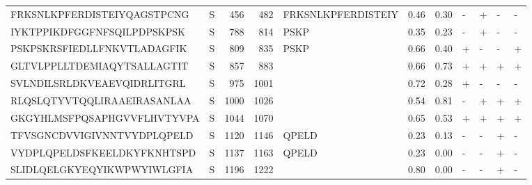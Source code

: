 \begin{tabular}{llrrlrrllll}
FRKSNLKPFERDISTEIYQAGSTPCNG &       S &    456 &   482 &  FRKSNLKPFERDISTEIY &            0.46 &             0.30 &      - &       + &      - &       - \\
IYKTPPIKDFGGFNFSQILPDPSKPSK &       S &    788 &   814 &                PSKP &            0.35 &             0.23 &      - &       + &      - &       - \\
PSKPSKRSFIEDLLFNKVTLADAGFIK &       S &    809 &   835 &                PSKP &            0.66 &             0.40 &      + &       - &      - &       + \\
GLTVLPPLLTDEMIAQYTSALLAGTIT &       S &    857 &   883 &                     &            0.66 &             0.73 &      + &       + &      + &       + \\
SVLNDILSRLDKVEAEVQIDRLITGRL &       S &    975 &  1001 &                     &            0.72 &             0.28 &      + &       - &      - &       - \\
RLQSLQTYVTQQLIRAAEIRASANLAA &       S &   1000 &  1026 &                     &            0.54 &             0.81 &      - &       + &      + &       + \\
GKGYHLMSFPQSAPHGVVFLHVTYVPA &       S &   1044 &  1070 &                     &            0.65 &             0.53 &      + &       + &      + &       + \\
TFVSGNCDVVIGIVNNTVYDPLQPELD &       S &   1120 &  1146 &               QPELD &            0.23 &             0.13 &      - &       - &      + &       - \\
VYDPLQPELDSFKEELDKYFKNHTSPD &       S &   1137 &  1163 &               QPELD &            0.23 &             0.00 &      - &       - &      + &       - \\
SLIDLQELGKYEQYIKWPWYIWLGFIA &       S &   1196 &  1222 &                     &            0.80 &             0.00 &      - &       - &      + &       - \\
\bottomrule
\end{tabular}
